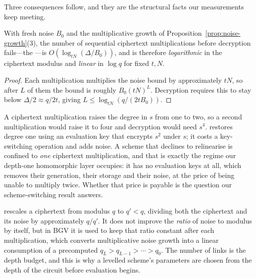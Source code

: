 Three consequences follow, and they are the structural facts our measurements
keep meeting.

\begin{corolary}
\label{cor:depth}
With fresh noise $B_0$ and the multiplicative growth of
Proposition~\ref{prop:noise-growth}(3), the number of sequential ciphertext
multiplications before decryption fails---the ---is
$O(\log_{tN}(\Delta/B_0))$, and is therefore \emph{logarithmic} in the ciphertext
modulus and \emph{linear} in $\log q$ for fixed $t,N$.
\end{corolary}

\begin{proof}
Each multiplication multiplies the noise bound by approximately $tN$, so after $L$
of them the bound is roughly $B_0 (tN)^{L}$. Decryption requires this to stay
below $\Delta/2 \approx q/2t$, giving $L \le \log_{tN}(q/(2tB_0))$.
\end{proof}

\begin{remark}
\label{rem:relin}
A ciphertext multiplication raises the degree in $s$ from one to two, so a second
multiplication would raise it to four and decryption would need $s^4$.
 restores degree one using an evaluation key that encrypts
$s^2$ under $s$; it costs a key-switching operation and adds noise. A scheme that
declines to relinearise is confined to \emph{one} ciphertext multiplication, and
that is exactly the regime our depth-one homomorphic layer occupies: it has no
evaluation keys at all, which removes their generation, their storage and their
noise, at the price of being unable to multiply twice. Whether that price is
payable is the question our scheme-switching result answers.
\end{remark}

\begin{remark}
\label{rem:modswitch}
 rescales a ciphertext from modulus $q$ to $q' < q$,
dividing both the ciphertext and its noise by approximately $q/q'$. It does not
improve the \emph{ratio} of noise to modulus by itself, but in BGV it is used to
keep that ratio constant after each multiplication, which converts multiplicative
noise growth into a linear consumption of a precomputed 
$q_L > q_{L-1} > \cdots > q_0$. The number of links is the depth budget, and this
is why a levelled scheme's parameters are chosen from the depth of the circuit
before evaluation begins.
\end{remark}

